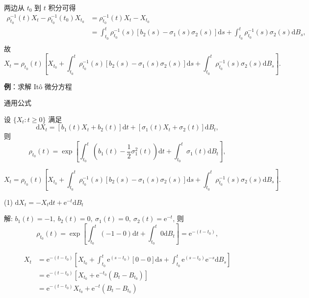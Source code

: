 \documentclass[openany]{ctexbook}
\theoremstyle{kaiti}
\theoremstyle{normal}
\begin{document}
两边从 $t_0$ 到 $t$ 积分可得
\begin{equation}
  \begin{aligned}
    \rho_{t_0}^{-1}(t)X_t-\rho_{t_0}^{-1}(t_0)X_{t_0}
    &=\rho_{t_0}^{-1}(t)X_t-X_{t_0}\\
    &=\int_{t_0}^t\rho_{t_0}^{-1}(s)[b_2(s)-\sigma_1(s)\sigma_2(s)]\mathrm{d}s+\int_{t_0}^t\rho_{t_0}^{-1}(s)\sigma_2(s)\mathrm{d}B_s,\\
  \end{aligned}
\end{equation}
故
\begin{equation}
  X_t=\rho_{t_0}(t)\left[X_{t_0}+\int_{t_0}^t\rho_{t_0}^{-1}(s)[b_2(s)-\sigma_1(s)\sigma_2(s)]\mathrm{d}s+\int_{t_0}^t\rho_{t_0}^{-1}(s)\sigma_2(s)\mathrm{d}B_s\right].
\end{equation}

\textbf{例}：求解 It\^o 微分方程

通用公式

设 $\{X_t:t\geqslant0\}$ 满足
\begin{equation}
  \mathrm{d}X_t=[b_1(t) X_t+b_2(t)]\mathrm{d}t+[\sigma_1(t) X_t+\sigma_2(t)]\mathrm{d}B_t,
\end{equation}
则
\begin{equation}
  \rho_{t_0}(t)=\exp\left[\int_{t_0}^t\left(b_1(t)-\frac{1}{2}\sigma_1^2(t)\right)\mathrm{d}t+\int_{t_0}^t\sigma_1(t) \mathrm{d}B_t\right],
\end{equation}

\begin{equation}
  X_t=\rho_{t_0}(t)\left[X_{t_0}+\int_{t_0}^t\rho_{t_0}^{-1}(s)[b_2(s)-\sigma_1(s)\sigma_2(s)]\mathrm{d}s+\int_{t_0}^t\rho_{t_0}^{-1}(s)\sigma_2(s)\mathrm{d}B_s\right].
\end{equation}

(1) $\mathrm{d}X_t=-X_t\mathrm{d}t+\mathrm{e}^{-t}\mathrm{d}B_t$

解: $b_1(t)=-1,~b_2(t)=0,~\sigma_1(t)=0,~\sigma_2(t)=\mathrm{e}^{-t}$, 则
\begin{equation}
  \rho_{t_0}(t)=\exp\left[\int_{t_0}^t\left(-1-0\right)\mathrm{d}t+\int_{t_0}^t0 \mathrm{d}B_t\right]=\mathrm{e}^{-(t-t_0)},
\end{equation}

\begin{equation}
  \begin{aligned}
    X_t
    &=\mathrm{e}^{-(t-t_0)}\left[X_{t_0}+\int_{t_0}^t\mathrm{e}^{(s-t_0)}[0-0]\mathrm{d}s+\int_{t_0}^t\mathrm{e}^{(s-t_0)}\mathrm{e}^{-s}\mathrm{d}B_s\right]\\
    &=\mathrm{e}^{-(t-t_0)}\left[X_{t_0}+\mathrm{e}^{-t_0}(B_t-B_{t_0})\right]\\
    &=\mathrm{e}^{-(t-t_0)}X_{t_0}+\mathrm{e}^{-t}(B_t-B_{t_0})\\
  \end{aligned}
\end{equation}
\end{document}
